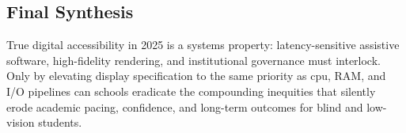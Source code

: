 \subsection*{Final Synthesis}

True digital accessibility in 2025 is a systems property: latency-sensitive assistive software, high-fidelity rendering, and institutional governance must interlock. Only by elevating display specification to the same priority as \gls{cpu}, RAM, and I/O pipelines can schools eradicate the compounding inequities that silently erode academic pacing, confidence, and long-term outcomes for blind and low-vision students.